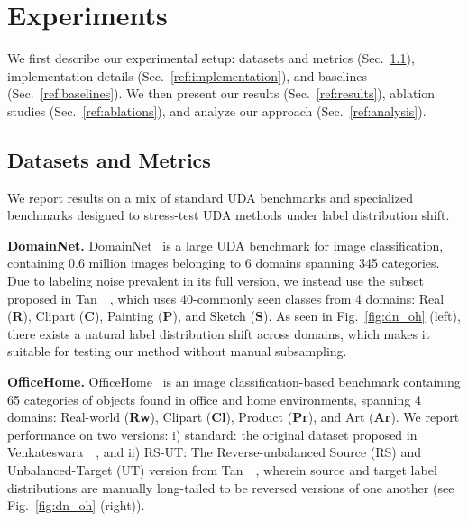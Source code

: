 \documentclass[10pt,twocolumn,letterpaper]{article}
\begin{document}
 \vspace{-10pt}
\section{Experiments}
\label{sec:experiments}
\vspace{-5pt}

\par\noindent We first describe our experimental setup: datasets and metrics (Sec.~\ref{ref:datasets}), implementation details (Sec.~\ref{ref:implementation}), and baselines (Sec.~\ref{ref:baselines}). We then present our results (Sec.~\ref{ref:results}), ablation studies (Sec.~\ref{ref:ablations}), and analyze our approach (Sec.~\ref{ref:analysis}).

\vspace{-5pt}
\subsection{Datasets and Metrics}
\label{ref:datasets}
\vspace{-5pt}

\par\noindent We report results on a mix of standard UDA benchmarks and specialized benchmarks designed to stress-test UDA methods under label distribution shift.

\par\noindent\textbf{DomainNet.} DomainNet~\cite{peng2019moment} is a large UDA benchmark for image classification, containing 0.6 million images belonging to 6 domains spanning 345 categories. Due to labeling noise prevalent in its full version, we instead use the subset proposed in Tan~\etal~\cite{tan2019generalized}, which uses 40-commonly seen classes from 4 domains: Real (\textbf{R}), Clipart (\textbf{C}), Painting (\textbf{P}), and Sketch (\textbf{S}). As seen in Fig.~\ref{fig:dn_oh} (left), there exists a natural label distribution shift across domains, which makes it suitable for testing our method without manual subsampling.

\par\noindent\textbf{OfficeHome.} OfficeHome~\cite{venkateswara2017deep} is an image classification-based benchmark containing 65 categories of objects found in office and home environments, spanning 4 domains: Real-world (\textbf{Rw}), Clipart (\textbf{Cl}), Product (\textbf{Pr}), and Art (\textbf{Ar}). We report performance on two versions: i) standard: the original dataset proposed in Venkateswara~\etal~\cite{venkateswara2017deep}, and ii) RS-UT: The Reverse-unbalanced Source (RS) and Unbalanced-Target (UT) version from Tan~\etal~\cite{tan2019generalized}, wherein source and target label distributions are manually long-tailed to be reversed versions of one another (see Fig.~\ref{fig:dn_oh} (right)).
\end{document}

